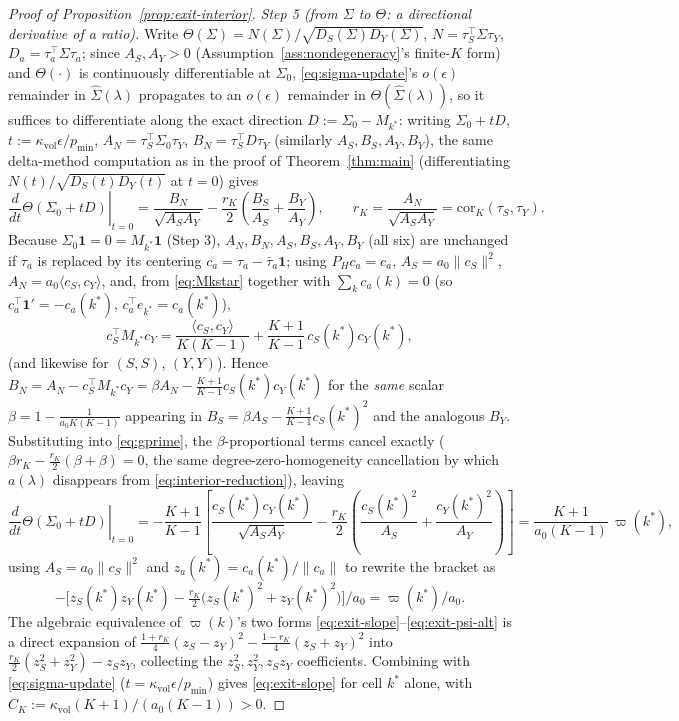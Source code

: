 \documentclass[11pt]{article}
\theoremstyle{plain}
\theoremstyle{definition}
\theoremstyle{remark}
\newcommand{\Corr}{\mathrm{cor}}
\begin{document}
\begin{proof}[Proof of Proposition~\ref{prop:exit-interior}]
\emph{Step 5 (from $\Sigma$ to $\Theta$: a directional derivative of a ratio).}
Write $\Theta(\Sigma)=N(\Sigma)/\sqrt{D_S(\Sigma)D_Y(\Sigma)}$,
$N=\tau_S^\top\Sigma\tau_Y$, $D_a=\tau_a^\top\Sigma\tau_a$; since $A_S,A_Y>0$
(Assumption~\ref{ass:nondegeneracy}'s finite-$K$ form) and $\Theta(\cdot)$ is
continuously differentiable at $\Sigma_0$, \eqref{eq:sigma-update}'s $o(\epsilon)$
remainder in $\hat\Sigma(\lambda)$ propagates to an $o(\epsilon)$ remainder in
$\Theta(\hat\Sigma(\lambda))$, so it suffices to differentiate along the exact
direction $D:=\Sigma_0-M_{k^*}$: writing $\Sigma_0+tD$, $t:=\kappa_{\mathrm{vol}}\epsilon/p_{\min}$,
$A_N=\tau_S^\top\Sigma_0\tau_Y$, $B_N=\tau_S^\top D\tau_Y$ (similarly
$A_S,B_S,A_Y,B_Y$), the same delta-method computation as in the proof of
Theorem~\ref{thm:main} (differentiating $N(t)/\sqrt{D_S(t)D_Y(t)}$ at $t=0$) gives
\begin{equation}\label{eq:gprime}
    \left.\frac{d}{dt}\Theta(\Sigma_0+tD)\right|_{t=0}
    =\frac{B_N}{\sqrt{A_SA_Y}}-\frac{r_K}2\left(\frac{B_S}{A_S}+\frac{B_Y}{A_Y}\right),
    \qquad r_K=\frac{A_N}{\sqrt{A_SA_Y}}=\Corr_K(\tau_S,\tau_Y).
\end{equation}
Because $\Sigma_0\mathbf1=0=M_{k^*}\mathbf1$ (Step 3), $A_N,B_N,A_S,B_S,A_Y,B_Y$
(all six) are unchanged if $\tau_a$ is replaced by its centering
$c_a=\tau_a-\bar\tau_a\mathbf1$; using $P_Hc_a=c_a$, $A_S=a_0\|c_S\|^2$,
$A_N=a_0\langle c_S,c_Y\rangle$, and, from \eqref{eq:Mkstar} together with
$\sum_kc_a(k)=0$ (so $c_a^\top\mathbf1'=-c_a(k^*)$, $c_a^\top e_{k^*}=c_a(k^*)$),
\begin{equation}\label{eq:Mkstar-quad}
    c_S^\top M_{k^*}c_Y=\frac{\langle c_S,c_Y\rangle}{K(K-1)}+\frac{K+1}{K-1}\,c_S(k^*)c_Y(k^*),
\end{equation}
(and likewise for $(S,S)$, $(Y,Y)$). Hence
$B_N=A_N-c_S^\top M_{k^*}c_Y=\beta A_N-\frac{K+1}{K-1}c_S(k^*)c_Y(k^*)$ for the
\emph{same} scalar $\beta=1-\frac1{a_0K(K-1)}$ appearing in
$B_S=\beta A_S-\frac{K+1}{K-1}c_S(k^*)^2$ and the analogous $B_Y$. Substituting into
\eqref{eq:gprime}, the $\beta$-proportional terms cancel exactly
($\beta r_K-\frac{r_K}2(\beta+\beta)=0$, the same degree-zero-homogeneity
cancellation by which $a(\lambda)$ disappears from \eqref{eq:interior-reduction}),
leaving
\[
    \left.\frac{d}{dt}\Theta(\Sigma_0+tD)\right|_{t=0}
    =-\frac{K+1}{K-1}\left[\frac{c_S(k^*)c_Y(k^*)}{\sqrt{A_SA_Y}}
    -\frac{r_K}2\left(\frac{c_S(k^*)^2}{A_S}+\frac{c_Y(k^*)^2}{A_Y}\right)\right]
    =\frac{K+1}{a_0(K-1)}\,\varpi(k^*),
\]
using $A_S=a_0\|c_S\|^2$ and $z_a(k^*)=c_a(k^*)/\|c_a\|$ to rewrite the bracket as
\[
    -\Big[z_S(k^*)z_Y(k^*)-\tfrac{r_K}2\big(z_S(k^*)^2+z_Y(k^*)^2\big)\Big]/a_0=\varpi(k^*)/a_0.
\]
The algebraic equivalence of $\varpi(k)$'s two forms
\eqref{eq:exit-slope}--\eqref{eq:exit-psi-alt} is a direct expansion of
$\tfrac{1+r_K}4(z_S-z_Y)^2-\tfrac{1-r_K}4(z_S+z_Y)^2$ into
$\tfrac{r_K}2(z_S^2+z_Y^2)-z_Sz_Y$, collecting the $z_S^2,z_Y^2,z_Sz_Y$
coefficients. Combining with \eqref{eq:sigma-update}
($t=\kappa_{\mathrm{vol}}\epsilon/p_{\min}$) gives \eqref{eq:exit-slope} for cell
$k^*$ alone, with $C_K:=\kappa_{\mathrm{vol}}(K+1)/(a_0(K-1))>0$.


\end{proof}
\end{document}
